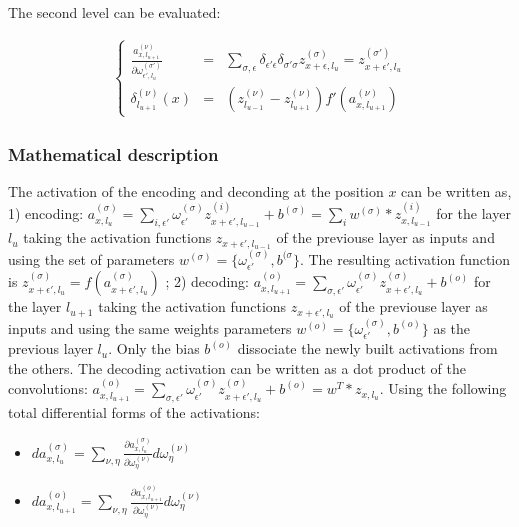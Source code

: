 \documentclass[final, paper=letter,5p,times,twocolumn]{elsarticle}
\begin{document}
The second level can be evaluated:

\begin{eqnarray*}
  \left \lbrace
  \begin{array}{rcl}
    \frac{a_{x,l_{u+1}}^{(\nu)}}{\partial \omega_{\epsilon',l_{u}}^{(\sigma')}} & = & \sum_{\sigma,\epsilon} \delta_{\epsilon' \epsilon} \delta_{\sigma' \sigma} z_{x+\epsilon,l_{u}}^{(\sigma)} = z_{x+\epsilon',l_{u}}^{(\sigma')} \\
    \delta_{l_{u+1}}^{(\nu)}(x) & = & \left( z_{l_{u-1}}^{(\nu)} - z_{l_{u+1}}^{(\nu)} \right) f'(a_{x,l_{u+1}}^{(\nu)})
  \end{array}
  \right .
\end{eqnarray*}
  
\subsubsection{Mathematical description}

The activation of the encoding and deconding at the position $x$ can be written as, 1) encoding: $a_{x,l_{u}}^{(\sigma)} = \sum_{i,\epsilon'} \omega_{\epsilon'}^{(\sigma)} z_{x+\epsilon',l_{u-1}}^{(i)} + b^{(\sigma)} = \sum_{i} w^{(\sigma)} * z_{x,l_{u-1}}^{(i)}$ for the layer $l_{u}$ taking the activation functions $z_{x+\epsilon',l_{u-1}}$ of the previouse layer as inputs and using the set of parameters $w^{(\sigma)} = \lbrace \omega_{\epsilon'}^{(\sigma)}, b^{(\sigma}\rbrace$. The resulting activation function is $z_{x+\epsilon',l_{u}}^{(\sigma)} = f(a_{x+\epsilon',l_{u}}^{(\sigma)})$ ; 2) decoding: $a_{x,l_{u+1}}^{(o)} = \sum_{\sigma,\epsilon'} \omega_{\epsilon'}^{(\sigma)} z_{x+\epsilon',l_{u}}^{(\sigma)} + b^{(o)}$ for the layer $l_{u+1}$ taking the activation functions $z_{x+\epsilon',l_{u}}$ of the previouse layer as inputs and using the same weights parameters $w^{(o)} = \lbrace \omega_{\epsilon'}^{(\sigma)}, b^{(o)}\rbrace$ as the previous layer $l_{u}$. Only the bias $b^{(o)}$ dissociate the newly built activations from the others. The decoding activation can be written as a dot product of the convolutions: $a_{x,l_{u+1}}^{(o)} = \sum_{\sigma,\epsilon'} \omega_{\epsilon'}^{(\sigma)} z_{x+\epsilon',l_{u}}^{(\sigma)} + b^{(o)} = w^{T}*z_{x,l_{u}}$. Using the following total differential forms of the activations:

\begin{itemize}
  \item $da_{x,l_{u}}^{(\sigma)} = \sum_{\nu,\eta} \frac{\partial a_{x,l_{u}}^{(\sigma)}}{\partial \omega_{\eta}^{(\nu)}} d\omega_{\eta}^{(\nu)}$
  \item $da_{x,l_{u+1}}^{(o)} = \sum_{\nu,\eta} \frac{\partial a_{x,l_{u+1}}^{(o)}}{\partial \omega_{\eta}^{(\nu)}} d\omega_{\eta}^{(\nu)}$
\end{itemize}
\end{document}
